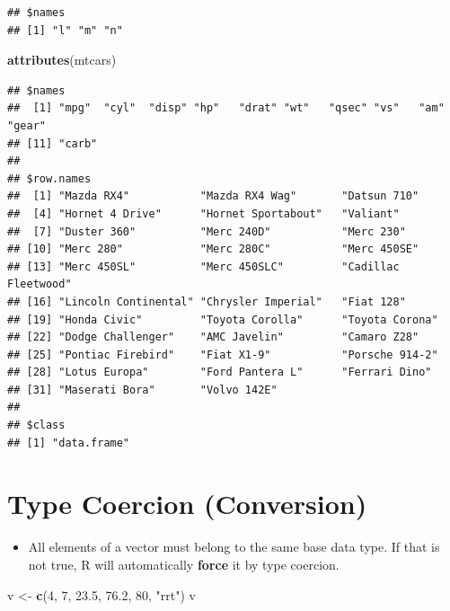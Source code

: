 \documentclass[]{book}
\newenvironment{Shaded}{\begin{snugshade}}{\end{snugshade}}
\newcommand{\KeywordTok}[1]{\textcolor[rgb]{0.13,0.29,0.53}{\textbf{{#1}}}}
\newcommand{\DecValTok}[1]{\textcolor[rgb]{0.00,0.00,0.81}{{#1}}}
\newcommand{\FloatTok}[1]{\textcolor[rgb]{0.00,0.00,0.81}{{#1}}}
\newcommand{\StringTok}[1]{\textcolor[rgb]{0.31,0.60,0.02}{{#1}}}
\newcommand{\NormalTok}[1]{{#1}}
\providecommand{\tightlist}{%
  \setlength{\itemsep}{0pt}\setlength{\parskip}{0pt}}
\begin{document}
\begin{verbatim}
## $names
## [1] "l" "m" "n"
\end{verbatim}

\begin{Shaded}
\begin{Highlighting}[]
\KeywordTok{attributes}\NormalTok{(mtcars)}
\end{Highlighting}
\end{Shaded}

\begin{verbatim}
## $names
##  [1] "mpg"  "cyl"  "disp" "hp"   "drat" "wt"   "qsec" "vs"   "am"   "gear"
## [11] "carb"
## 
## $row.names
##  [1] "Mazda RX4"           "Mazda RX4 Wag"       "Datsun 710"         
##  [4] "Hornet 4 Drive"      "Hornet Sportabout"   "Valiant"            
##  [7] "Duster 360"          "Merc 240D"           "Merc 230"           
## [10] "Merc 280"            "Merc 280C"           "Merc 450SE"         
## [13] "Merc 450SL"          "Merc 450SLC"         "Cadillac Fleetwood" 
## [16] "Lincoln Continental" "Chrysler Imperial"   "Fiat 128"           
## [19] "Honda Civic"         "Toyota Corolla"      "Toyota Corona"      
## [22] "Dodge Challenger"    "AMC Javelin"         "Camaro Z28"         
## [25] "Pontiac Firebird"    "Fiat X1-9"           "Porsche 914-2"      
## [28] "Lotus Europa"        "Ford Pantera L"      "Ferrari Dino"       
## [31] "Maserati Bora"       "Volvo 142E"         
## 
## $class
## [1] "data.frame"
\end{verbatim}

\section{Type Coercion (Conversion)}\label{type-coercion-conversion}

\begin{itemize}
\tightlist
\item
  All elements of a vector must belong to the same base data type. If
  that is not true, R will automatically \textbf{force} it by type
  coercion.
\end{itemize}

\begin{Shaded}
\begin{Highlighting}[]
\NormalTok{v <-}\StringTok{ }\KeywordTok{c}\NormalTok{(}\DecValTok{4}\NormalTok{, }\DecValTok{7}\NormalTok{, }\FloatTok{23.5}\NormalTok{, }\FloatTok{76.2}\NormalTok{, }\DecValTok{80}\NormalTok{, }\StringTok{"rrt"}\NormalTok{)}
\NormalTok{v}
\end{Highlighting}
\end{Shaded}
\end{document}
